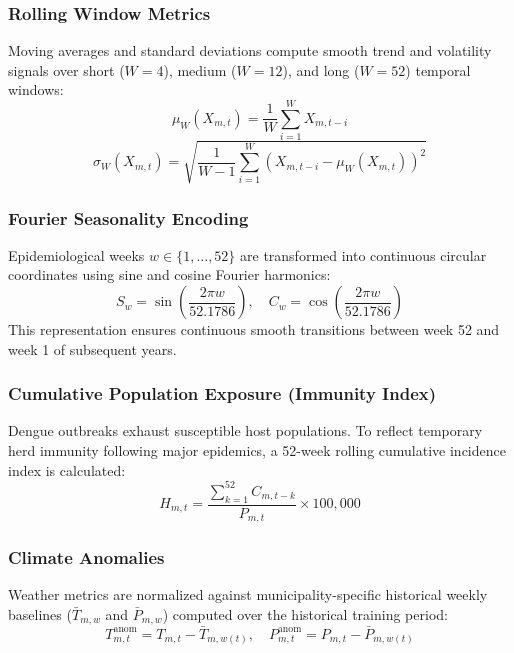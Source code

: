 \documentclass[journal,onecolumn,11pt]{IEEEtran}
\begin{document}
\subsubsection{Rolling Window Metrics}
Moving averages and standard deviations compute smooth trend and volatility signals over short ($W=4$), medium ($W=12$), and long ($W=52$) temporal windows:
\begin{equation}
    \mu_{W}(X_{m,t}) = \frac{1}{W} \sum_{i=1}^{W} X_{m,t-i}
\end{equation}
\begin{equation}
    \sigma_{W}(X_{m,t}) = \sqrt{\frac{1}{W-1} \sum_{i=1}^{W} \left(X_{m,t-i} - \mu_{W}(X_{m,t})\right)^2}
\end{equation}

\subsubsection{Fourier Seasonality Encoding}
Epidemiological weeks $w \in \{1, \dots, 52\}$ are transformed into continuous circular coordinates using sine and cosine Fourier harmonics:
\begin{equation}
    S_w = \sin\left( \frac{2\pi w}{52.1786} \right), \quad C_w = \cos\left( \frac{2\pi w}{52.1786} \right)
\end{equation}
This representation ensures continuous smooth transitions between week 52 and week 1 of subsequent years.

\subsubsection{Cumulative Population Exposure (Immunity Index)}
Dengue outbreaks exhaust susceptible host populations. To reflect temporary herd immunity following major epidemics, a 52-week rolling cumulative incidence index is calculated:
\begin{equation}
    H_{m,t} = \frac{\sum_{k=1}^{52} C_{m,t-k}}{P_{m,t}} \times 100,000
\end{equation}

\subsubsection{Climate Anomalies}
Weather metrics are normalized against municipality-specific historical weekly baselines ($\bar{T}_{m,w}$ and $\bar{P}_{m,w}$) computed over the historical training period:
\begin{equation}
    T^{\text{anom}}_{m,t} = T_{m,t} - \bar{T}_{m,w(t)}, \quad P^{\text{anom}}_{m,t} = P_{m,t} - \bar{P}_{m,w(t)}
\end{equation}
\end{document}
